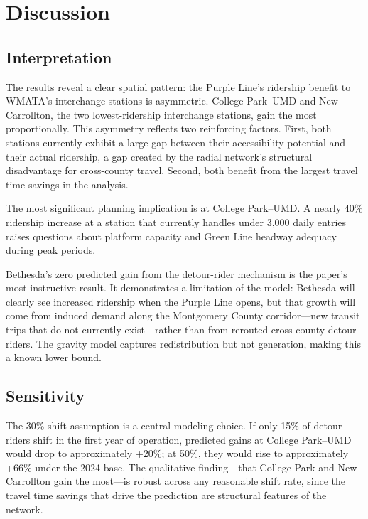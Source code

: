 \documentclass[11pt]{article}
\begin{document}
\section{Discussion}
\label{sec:discussion}

\subsection{Interpretation}

The results reveal a clear spatial pattern: the Purple Line's ridership
benefit to WMATA's interchange stations is asymmetric. College Park--UMD
and New Carrollton, the two lowest-ridership interchange stations, gain the
most proportionally. This asymmetry reflects two reinforcing factors.
First, both stations currently exhibit a large gap between their
accessibility potential and their actual ridership, a gap created by the
radial network's structural disadvantage for cross-county travel. Second,
both benefit from the largest travel time savings in the analysis.

The most significant planning implication is at College Park--UMD. A nearly
40\% ridership increase at a station that currently handles under 3,000
daily entries raises questions about platform capacity and Green Line
headway adequacy during peak periods.

Bethesda's zero predicted gain from the detour-rider mechanism is the
paper's most instructive result. It demonstrates a limitation of the
model: Bethesda will clearly see increased ridership when the Purple Line
opens, but that growth will come from induced demand along the Montgomery
County corridor---new transit trips that do not currently exist---rather
than from rerouted cross-county detour riders. The gravity model captures
redistribution but not generation, making this a known lower bound.

\subsection{Sensitivity}

The 30\% shift assumption is a central modeling choice. If only 15\% of
detour riders shift in the first year of operation, predicted gains at
College Park--UMD would drop to approximately +20\%; at 50\%, they would
rise to approximately +66\% under the 2024 base. The qualitative
finding---that College Park and New Carrollton gain the most---is robust
across any reasonable shift rate, since the travel time savings that drive
the prediction are structural features of the network.
\end{document}

